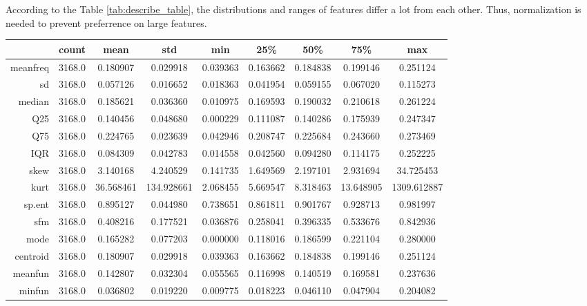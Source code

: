 \documentclass[12pt,a4paper]{article}
\theoremstyle{definition}
\begin{document}
\noindent
According to the Table \ref{tab:describe_table}, the distributions and ranges of features differ a lot from each other. Thus, normalization is needed to prevent preferrence on large features. \\

\begin{table}[htbp]
    \centering
    \begin{tabular}{r|lccccccc}
        & count    & mean   & std       & min        & 25\%     & 50\%     & 75\%     & max \\
        \hline
    meanfreq & 3168.0 & 0.180907  & 0.029918   & 0.039363 & 0.163662 & 0.184838 & 0.199146  & 0.251124       \\
    sd       & 3168.0 & 0.057126  & 0.016652   & 0.018363 & 0.041954 & 0.059155 & 0.067020  & 0.115273       \\
    median   & 3168.0 & 0.185621  & 0.036360   & 0.010975 & 0.169593 & 0.190032 & 0.210618  & 0.261224       \\
    Q25      & 3168.0 & 0.140456  & 0.048680   & 0.000229 & 0.111087 & 0.140286 & 0.175939  & 0.247347       \\
    Q75      & 3168.0 & 0.224765  & 0.023639   & 0.042946 & 0.208747 & 0.225684 & 0.243660  & 0.273469       \\
    IQR      & 3168.0 & 0.084309  & 0.042783   & 0.014558 & 0.042560 & 0.094280 & 0.114175  & 0.252225       \\
    skew     & 3168.0 & 3.140168  & 4.240529   & 0.141735 & 1.649569 & 2.197101 & 2.931694  & 34.725453      \\
    kurt     & 3168.0 & 36.568461 & 134.928661 & 2.068455 & 5.669547 & 8.318463 & 13.648905 & 1309.612887    \\
    sp.ent   & 3168.0 & 0.895127  & 0.044980   & 0.738651 & 0.861811 & 0.901767 & 0.928713  & 0.981997       \\
    sfm      & 3168.0 & 0.408216  & 0.177521   & 0.036876 & 0.258041 & 0.396335 & 0.533676  & 0.842936       \\
    mode     & 3168.0 & 0.165282  & 0.077203   & 0.000000 & 0.118016 & 0.186599 & 0.221104  & 0.280000       \\
    centroid & 3168.0 & 0.180907  & 0.029918   & 0.039363 & 0.163662 & 0.184838 & 0.199146  & 0.251124       \\
    meanfun  & 3168.0 & 0.142807  & 0.032304   & 0.055565 & 0.116998 & 0.140519 & 0.169581  & 0.237636       \\
    minfun   & 3168.0 & 0.036802  & 0.019220   & 0.009775 & 0.018223 & 0.046110 & 0.047904  & 0.204082       \\

\end{tabular}
\end{table}
\end{document}

